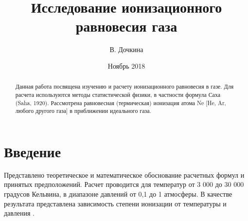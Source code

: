 \documentclass[letterpaper,12pt]{article}
\begin{document}
\title{Исследование ионизационного равновесия газа}
\author{В. Дочкина}
\date{Ноябрь 2018}
\maketitle

\begin{abstract}
Данная работа посвящена изучению и расчету ионизационного равновесия в газе. Для расчета используются методы статистической физики, в частности формула Саха (Saha, 1920). 
Рассмотрена равновесная (термическая) ионизация атома Ne [He, Ar, любого другого газа] в приближении идеального газа. 
\end{abstract}


\section{Введение}

Представлено теоретическое и математическое обоснование расчетных формул и принятых предположений. 
Расчет проводится для температур от 3 000 до 30 000 градусов Кельвина, в диапазоне давлений от 0,1 до 1 атмосферы. 
В качестве результата представлена зависимость степени ионизации от температуры и давления .
\end{document}
